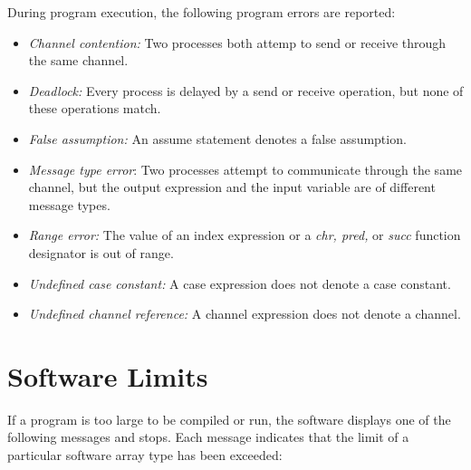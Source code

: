 During program execution, the following program errors are
reported:

\begin{itemize}
  \item
  {\it Channel contention:} Two processes both attemp to
  send or receive through the same channel.
  \item
  {\it Deadlock:} Every process is delayed by a send or
  receive operation, but none of these operations match.
  \item
  {\it False assumption:} An assume statement denotes a
  false assumption.
  \item
  {\it Message type error}: Two processes attempt to
  communicate through the same channel, but the output
  expression and the input variable are of different message
  types.
  \item
  {\it Range error:} The value of an index expression or a
  {\it chr, pred,} or {\it succ} function designator is out
  of range.
  \item
  {\it Undefined case constant:} A case expression does not
  denote a case constant.
  \item
  {\it Undefined channel reference:} A channel expression
  does not denote a channel.
\end{itemize}


\section{Software Limits}

If a program is too large to be compiled or run, the software
displays one of the following messages and stops. Each
message indicates that the limit of a particular software
array type has been exceeded:

